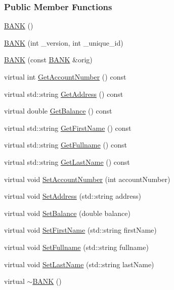 \subsubsection*{Public Member Functions}
\begin{DoxyCompactItemize}
\item 
\hyperlink{class_b_a_n_k_a0bc938356cebff14fb0560264abe5a34_a0bc938356cebff14fb0560264abe5a34}{B\+A\+NK} ()
\item 
\hyperlink{class_b_a_n_k_a7382dd275d8f4f10a8b53ccbc93e1e87_a7382dd275d8f4f10a8b53ccbc93e1e87}{B\+A\+NK} (int \+\_\+version, int \+\_\+unique\+\_\+id)
\item 
\hyperlink{class_b_a_n_k_a4dd657c30039ea00a040e6226c23ccd4_a4dd657c30039ea00a040e6226c23ccd4}{B\+A\+NK} (const \hyperlink{class_b_a_n_k}{B\+A\+NK} \&orig)
\item 
virtual int \hyperlink{class_b_a_n_k_a62adf3cea60d863a4a10eeee485fa1aa_a62adf3cea60d863a4a10eeee485fa1aa}{Get\+Account\+Number} () const 
\item 
virtual std\+::string \hyperlink{class_b_a_n_k_a358741f647f9494026e02fd3fd27cde6_a358741f647f9494026e02fd3fd27cde6}{Get\+Address} () const 
\item 
virtual double \hyperlink{class_b_a_n_k_a7ac46c74859cebdc933cb27e148d18b1_a7ac46c74859cebdc933cb27e148d18b1}{Get\+Balance} () const 
\item 
virtual std\+::string \hyperlink{class_b_a_n_k_ad0ba1c785c67e7d4760dc8776f3d4bca_ad0ba1c785c67e7d4760dc8776f3d4bca}{Get\+First\+Name} () const 
\item 
virtual std\+::string \hyperlink{class_b_a_n_k_aa1528c533bf6389bc8d7f3eeca114bab_aa1528c533bf6389bc8d7f3eeca114bab}{Get\+Fullname} () const 
\item 
virtual std\+::string \hyperlink{class_b_a_n_k_a4612063ec2bfd6d883a77a0d3697af90_a4612063ec2bfd6d883a77a0d3697af90}{Get\+Last\+Name} () const 
\item 
virtual void \hyperlink{class_b_a_n_k_a9d8fb8bde35d63eca7e9f87d22b45752_a9d8fb8bde35d63eca7e9f87d22b45752}{Set\+Account\+Number} (int account\+Number)
\item 
virtual void \hyperlink{class_b_a_n_k_a52ad99454b2059d44967868157208393_a52ad99454b2059d44967868157208393}{Set\+Address} (std\+::string address)
\item 
virtual void \hyperlink{class_b_a_n_k_ae3e45b407bf8ec7175662442ea24b7c0_ae3e45b407bf8ec7175662442ea24b7c0}{Set\+Balance} (double balance)
\item 
virtual void \hyperlink{class_b_a_n_k_a547cb9f21be894f045bb3cec6b12525c_a547cb9f21be894f045bb3cec6b12525c}{Set\+First\+Name} (std\+::string first\+Name)
\item 
virtual void \hyperlink{class_b_a_n_k_a8845dbfc7ddfbc2e0c0efda561a70ec3_a8845dbfc7ddfbc2e0c0efda561a70ec3}{Set\+Fullname} (std\+::string fullname)
\item 
virtual void \hyperlink{class_b_a_n_k_a2dc1b7664f9e3b005cb33e71b2ba42ee_a2dc1b7664f9e3b005cb33e71b2ba42ee}{Set\+Last\+Name} (std\+::string last\+Name)
\item 
virtual \hyperlink{class_b_a_n_k_ad609a1e004efdebab6495d95eced2346_ad609a1e004efdebab6495d95eced2346}{$\sim$\+B\+A\+NK} ()
\end{DoxyCompactItemize}


